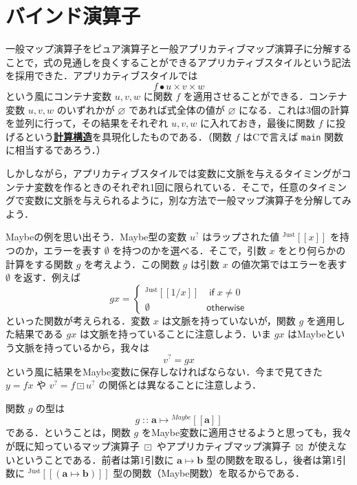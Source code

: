 \documentclass[a4paper,twocolumn]{jsbook}
\def\[{\left[\!\left[}
\def\]{\right]\!\right]}
\newcommand{\programminglanguage}[1]{\textsf{#1}}
\newcommand{\clang}{\programminglanguage{C}}
\newcommand{\keyword}[1]{{\underline{\textbf{#1}}}}
\newcommand{\code}[1]{\texttt{#1}}
\newcommand{\mKeyword}[1]{\mathsf{#1}} %
\newcommand{\mIfKeyword}{\mKeyword{if}}
\newcommand{\mOtherwiseKeyword}{\mKeyword{otherwise}}
\DeclareMathOperator{\mIf}{\mIfKeyword}
\DeclareMathOperator{\mOtherwise}{\mOtherwiseKeyword}
\newcommand{\mNothing}{\emptyset}
\newcommand{\mPureNothing}{\varnothing}
\DeclareMathOperator{\mAppMap}{\times}
\DeclareMathOperator{\mAppMapMaybe}{\boxtimes}
\DeclareMathOperator{\mIn}{{:\!:}}
\DeclareMathOperator{\mMap}{\bullet}
\DeclareMathOperator{\mMapMaybe}{\boxdot}
\DeclareMathOperator{\mMapsTo}{\mapsto}
\newcommand{\mType}[1]{\mathbf{#1}}
\newcommand{\mTypeConstructor}[1]{\textit{#1}}
\newcommand{\mGenericTypeAssemble}[2]{{}^{\mTypeConstructor{#1}}\[\mType{#2}\]}
\newcommand{\mMaybeType}[1]{\mGenericTypeAssemble{Maybe}{#1}}
\newcommand{\mGenericValueConstructor}[1]{\mathrm{#1}}
\newcommand{\mGenericWith}[2]{{}^\mGenericValueConstructor{#1}\[#2\]}
\newcommand{\mJustWith}[1]{\mGenericWith{Just}{#1}}
\newcommand{\mMaybe}[1]{{#1}^?}
\newcommand{\mProj}[2]{#1\mMapsTo#2}
\begin{document}
\section{バインド演算子}


一般マップ演算子をピュア演算子と一般アプリカティブマップ演算子に分解することで，式の見通しを良くすることができるアプリカティブスタイルという記法を採用できた．アプリカティブスタイルでは
\begin{equation}
f\mMap u\mAppMap v\mAppMap w
\end{equation}
という風にコンテナ変数 $u,v,w$ に関数 $f$ を適用させることができる．コンテナ変数 $u,v,w$ のいずれかが $\mPureNothing$ であれば式全体の値が $\mPureNothing$ になる．これは3個の計算を並列に行って，その結果をそれぞれ $u,v,w$ に入れておき，最後に関数 $f$ に投げるという\keyword{計算構造}を具現化したものである．（関数 $f$ は\clang で言えば \code{main} 関数に相当するであろう．）

しかしながら，アプリカティブスタイルでは変数に文脈を与えるタイミングがコンテナ変数を作るときのそれぞれ1回に限られている．そこで，任意のタイミングで変数に文脈を与えられるように，別な方法で一般マップ演算子を分解してみよう．

Maybeの例を思い出そう．Maybe型の変数 $\mMaybe{u}$ はラップされた値 $\mJustWith{x}$ を持つのか，エラーを表す $\mNothing$ を持つのかを選べる．そこで，引数 $x$ をとり何らかの計算をする関数 $g$ を考えよう．この関数 $g$ は引数 $x$ の値次第ではエラーを表す $\mNothing$ を返す．例えば
\begin{equation}
gx=\begin{cases}
\mJustWith{1/x}&\mIf x\neq0\\
\mNothing&\mOtherwise
\end{cases}
\end{equation}
といった関数が考えられる．変数 $x$ は文脈を持っていないが，関数 $g$ を適用した結果である $gx$ は文脈を持っていることに注意しよう．いま $gx$ はMaybeという文脈を持っているから，我々は
\begin{equation}
\mMaybe{v}=gx
\end{equation}
という風に結果をMaybe変数に保存しなければならない．今まで見てきた $y=fx$ や $\mMaybe{v}=f\mMapMaybe\mMaybe{u}$ の関係とは異なることに注意しよう．

関数 $g$ の型は
\begin{equation}
g\mIn\mProj{\mType{a}}{\mMaybeType{a}}
\end{equation}
である．ということは，関数 $g$ をMaybe変数に適用させるようと思っても，我々が既に知っているマップ演算子 $\mMapMaybe$ やアプリカティブマップ演算子 $\mAppMapMaybe$ が使えないということである．前者は第1引数に $\mProj{\mType{a}}{\mType{b}}$ 型の関数を取るし，後者は第1引数に $\mJustWith{(\mProj{\mType{a}}{\mType{b}})}$ 型の関数（Maybe関数）を取るからである． %
\end{document}
